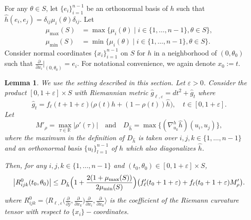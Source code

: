 \documentclass[10pt]{amsart}
\let\sep\mid
\newtheorem{lemma}[theorem]{Lemma}
\theoremstyle{definition}
\let\eps\varepsilon
\renewcommand{\>}{{\rangle}}
\newcommand{\<}{{\langle}}
\begin{document}
For any $\theta\in S$, let $\{e_i\}_{i=1}^{n-1}$ be an orthonormal basis of $h$ such that $\hat h(e_i,e_j)=\delta_{ij}\mu_i(\theta)\delta_{ij}$. Let
\begin{align*}
\mu_{\max}(S) &= \max\{\mu_i(\theta)\sep i\in\{1,\ldots, n-1\}, \theta\in S\},\\
\mu_{\min}(S) &= \min\{\mu_i(\theta)\sep i\in\{1,\ldots, n-1\}, \theta\in S\}.
\end{align*}
Consider normal coordinates $\{x_i\}_{i=1}^{n-1}$ on $S$ for $h$ in a neighborhood of $(0,\theta_0)$ such that $\frac{\partial}{\partial x_i}|_{(0,\theta_0)}=e_i.$ For notational convenience, we again denote $x_0:=t$.

\begin{lemma}\label{lem: bdd_curv_tensor_C3}
We use the setting described in this section. Let $\eps>0$. Consider the product $[0,1+\eps]\times S$ with Riemannian metric $\hat g_{\ell,\eps}=dt^2+\hat g_t$ where
\[
\hat g_t=f_\ell(t+1+\eps) \bigl(\rho(t)h+(1-\rho(t))\hat h \bigr),\quad t\in[0,1+\eps].
\]
Let
\begin{equation}\label{M_rho and D_h}
M'_{\rho} = \max_{\tau\in\mathbb R}|\rho'(\tau)|
\quad \text{and} \quad D_{\hat h} = \max\bigl\{(\nabla^h_{u_k}\hat h)(u_i,u_j)\bigr\},
\end{equation}
where the maximum in the definition of $D_{\hat h}$ is taken over $i,j,k\in\{1,\ldots, n-1\}$ and an orthonormal basis $\{u_l\}_{l=1}^{n-1}$ of $h$ which also diagonalizes $\hat h$.

Then, for any $i,j,k\in\{1,\ldots,n-1\}$ and $(t_0,\theta_0)\in[0,1+\eps]\times S$,
\begin{equation*}
\left|R^0_{ijk}(t_0,\theta_0)\right|\leq D_{\hat h}\Bigl(1+\frac{2(1+\mu_{\max}(S))}{2\mu_{\min}(S)}\Bigr) \bigl(f'_\ell(t_0+1+\eps)+f_\ell(t_0+1+\eps)M'_\rho \bigr).
\end{equation*}
where $R^0_{ijk} = \bigl\langle R_{\ell,\eps} \bigl(\frac{\partial}{\partial j},\frac{\partial}{\partial x_k} \bigr)\frac{\partial}{\partial x_i},\frac{\partial}{\partial x_0} \bigr\rangle$ is the coefficient of the Riemann curvature tensor with respect to $\{x_i\}-$coordinates.
\end{lemma}
\end{document}
